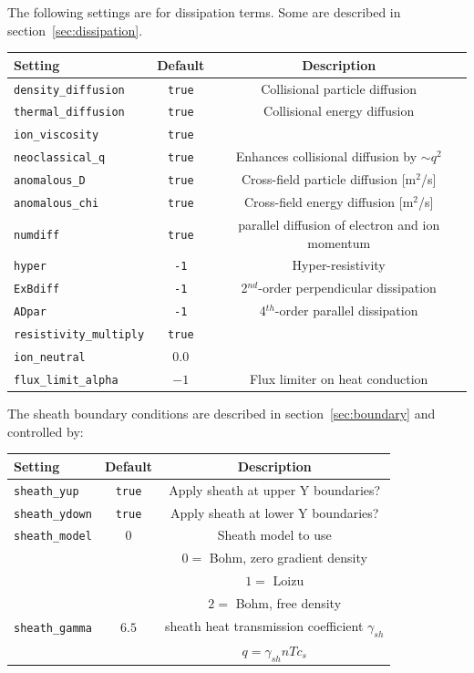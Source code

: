 \documentclass[12pt,a4paper]{article}
\begin{document}
The following settings are for dissipation terms.
Some are described in section~\ref{sec:dissipation}.
\begin{center}
\begin{tabular}{l c c}
  Setting & Default & Description \\
  \hline
  \texttt{density\_diffusion} & \texttt{true} & Collisional particle diffusion \\
  \texttt{thermal\_diffusion} & \texttt{true} & Collisional energy diffusion \\
  \texttt{ion\_viscosity} & \texttt{true} &  \\
  \texttt{neoclassical\_q} & \texttt{true} & Enhances collisional diffusion by $\sim q^2$ \\
  \hline
  \texttt{anomalous\_D} & \texttt{true} & Cross-field particle diffusion [m$^2$/s] \\
  \texttt{anomalous\_chi} & \texttt{true} & Cross-field energy diffusion [m$^2$/s] \\
  \hline
  \texttt{numdiff} & \texttt{true} & parallel diffusion of electron and ion momentum \\
  \texttt{hyper} & \texttt{-1} & Hyper-resistivity \\
  \texttt{ExBdiff} & \texttt{-1} & 2$^{nd}$-order perpendicular dissipation \\
  \texttt{ADpar} & \texttt{-1} & 4$^{th}$-order parallel dissipation \\
  \hline
  \texttt{resistivity\_multiply} & \texttt{true} &  \\
  \texttt{ion\_neutral} & $0.0$ & \\
  \texttt{flux\_limit\_alpha} & $-1$ & Flux limiter on heat conduction\\
  \hline
\end{tabular}
\end{center}

The sheath boundary conditions are described in section~\ref{sec:boundary} and controlled by:
\begin{center}
\begin{tabular}{l c c}
  Setting & Default & Description \\
  \hline
  \texttt{sheath\_yup} & \texttt{true} & Apply sheath at upper Y boundaries? \\
  \texttt{sheath\_ydown} & \texttt{true} & Apply sheath at lower Y boundaries? \\
  \texttt{sheath\_model} & $0$ & Sheath model to use \\
  &     & $0 = $ Bohm, zero gradient density \\
  &     & $1 = $ Loizu \\
  &     & $2 = $ Bohm, free density \\
  \texttt{sheath\_gamma} & $6.5$ & sheath heat transmission coefficient $\gamma_{sh}$\\
  & & $q = \gamma_{sh}nTc_s$ \\
  \hline
\end{tabular}
\end{center}
\end{document}
